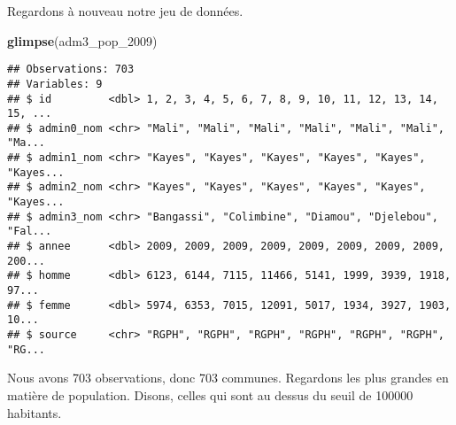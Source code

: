 \documentclass[]{book}
\newenvironment{Shaded}{\begin{snugshade}}{\end{snugshade}}
\newcommand{\KeywordTok}[1]{\textcolor[rgb]{0.13,0.29,0.53}{\textbf{#1}}}
\newcommand{\DecValTok}[1]{\textcolor[rgb]{0.00,0.00,0.81}{#1}}
\newcommand{\StringTok}[1]{\textcolor[rgb]{0.31,0.60,0.02}{#1}}
\newcommand{\CommentTok}[1]{\textcolor[rgb]{0.56,0.35,0.01}{\textit{#1}}}
\newcommand{\OperatorTok}[1]{\textcolor[rgb]{0.81,0.36,0.00}{\textbf{#1}}}
\newcommand{\NormalTok}[1]{#1}
\begin{document}
Regardons à nouveau notre jeu de données.

\begin{Shaded}
\begin{Highlighting}[]
\KeywordTok{glimpse}\NormalTok{(adm3_pop_}\DecValTok{2009}\NormalTok{)}
\end{Highlighting}
\end{Shaded}

\begin{verbatim}
## Observations: 703
## Variables: 9
## $ id         <dbl> 1, 2, 3, 4, 5, 6, 7, 8, 9, 10, 11, 12, 13, 14, 15, ...
## $ admin0_nom <chr> "Mali", "Mali", "Mali", "Mali", "Mali", "Mali", "Ma...
## $ admin1_nom <chr> "Kayes", "Kayes", "Kayes", "Kayes", "Kayes", "Kayes...
## $ admin2_nom <chr> "Kayes", "Kayes", "Kayes", "Kayes", "Kayes", "Kayes...
## $ admin3_nom <chr> "Bangassi", "Colimbine", "Diamou", "Djelebou", "Fal...
## $ annee      <dbl> 2009, 2009, 2009, 2009, 2009, 2009, 2009, 2009, 200...
## $ homme      <dbl> 6123, 6144, 7115, 11466, 5141, 1999, 3939, 1918, 97...
## $ femme      <dbl> 5974, 6353, 7015, 12091, 5017, 1934, 3927, 1903, 10...
## $ source     <chr> "RGPH", "RGPH", "RGPH", "RGPH", "RGPH", "RGPH", "RG...
\end{verbatim}

Nous avons 703 observations, donc 703 communes. Regardons les plus
grandes en matière de population. Disons, celles qui sont au dessus du
seuil de 100000 habitants.

\begin{Shaded}
\end{Shaded}
\end{document}
